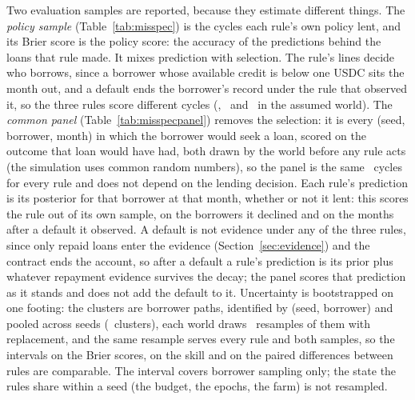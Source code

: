 \documentclass[preprint,11pt,authoryear]{elsarticle}
\begin{document}
Two evaluation samples are reported, because they estimate different things. The \emph{policy
sample} (Table~\ref{tab:misspec}) is the cycles each rule's own policy lent, and its Brier score is
the policy score: the accuracy of the predictions behind the loans that rule made. It mixes
prediction with selection. The rule's lines decide who borrows, since a borrower whose available
credit is below one USDC sits the month out, and a default ends the borrower's record under the rule
that observed it, so the three rules score different cycles (\CyclesWeightedAssumed,
\CyclesUnweightedAssumed\ and \CyclesTierOnlyAssumed\ in the assumed world). The \emph{common panel}
(Table~\ref{tab:misspecpanel}) removes the selection: it is every (seed, borrower, month) in which
the borrower would seek a loan, scored on the outcome that loan would have had, both drawn by the
world before any rule acts (the simulation uses common random numbers), so the panel is the same
\PanelCyclesAssumed\ cycles for every rule and does not depend on the lending decision. Each rule's
prediction is its posterior for that borrower at that month, whether or not it lent: this scores the
rule out of its own sample, on the borrowers it declined and on the months after a default it
observed. A default is not evidence under any of the three rules, since only repaid loans enter the
evidence (Section~\ref{sec:evidence}) and the contract ends the account, so after a default a rule's
prediction is its prior plus whatever repayment evidence survives the decay; the panel scores that
prediction as it stands and does not add the default to it. Uncertainty is bootstrapped on one
footing: the clusters are borrower paths, identified by (seed, borrower) and pooled across seeds
(\MisspecClusters\ clusters), each world draws \MisspecBoot\ resamples of them with replacement, and
the same resample serves every rule and both samples, so the intervals on the Brier scores, on the
skill and on the paired differences between rules are comparable. The interval covers borrower
sampling only; the state the rules share within a seed (the budget, the epochs, the farm) is not
resampled.
\end{document}
